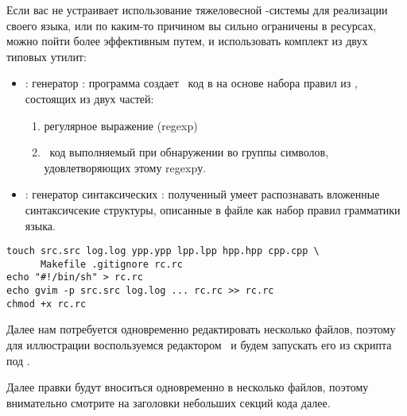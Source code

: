 \secdown

Если вас не устраивает использование тяжеловесной \racket-системы для реализации
своего языка, или по каким-то причином вы сильно ограничены в
ресурсах, можно пойти более эффективным путем, и использовать комплект
из двух типовых утилит:
\begin{itemize}
  \item \flex: генератор : программа создает
\cpp\ код в  на основе набора правил из , состоящих
из двух частей:
\begin{enumerate}
  \item регулярное выражение (regexp)
  \item \cpp\ код выполняемый при обнаружении во  группы
  символов, удовлетворяющих этому regexpу.
\end{enumerate}

\item \bison: генератор синтаксических : полученный
 умеет распознавать вложенные синтаксичсекие структуры,
описанные в файле  как набор правил грамматики языка.
\end{itemize}


\begin{verbatim}
touch src.src log.log ypp.ypp lpp.lpp hpp.hpp cpp.cpp \
      Makefile .gitignore rc.rc
echo "#!/bin/sh" > rc.rc
echo gvim -p src.src log.log ... rc.rc >> rc.rc
chmod +x rc.rc
\end{verbatim}

Далее нам потребуется одновременно редактировать несколько файлов, поэтому для
иллюстрации воспользуемся редактором \gvim\ и будем запускать его из скрипта
\file{rc.rc} под \linux.


Далее правки будут вноситься одновременно в несколько файлов, поэтому
внимательно смотрите на заголовки небольших секций кода далее.

\clearpage
{}
\clearpage



% 

\secup